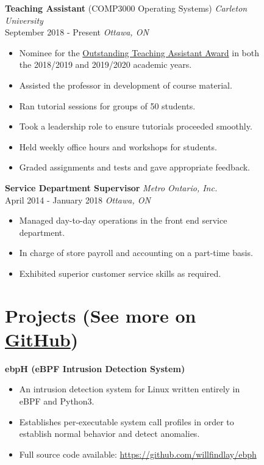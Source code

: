 \documentclass[
    10pt,
]
{article}
\begin{document}
\begin{figure}
\begin{minipage}[t]{0.65\textwidth}
\color{black}
\textbf{Teaching Assistant} (COMP3000 Operating Systems) \hfill \emph{Carleton University}\\
September 2018 - Present \hfill\emph {Ottawa, ON}
\color{gray}
\begin{itemize}[itemsep=0em]
    \item Nominee for the \href{https://carleton.ca/tasupport/taawards/edc-outstanding-ta-awards/}
        {Outstanding Teaching Assistant Award} in both the 2018/2019 and 2019/2020 academic years.
    \item Assisted the professor in development of course material.
    \item Ran tutorial sessions for groups of 50 students.
    \item Took a leadership role to ensure tutorials proceeded smoothly.
    \item Held weekly office hours and workshops for students.
    \item Graded assignments and tests and gave appropriate feedback.
\end{itemize}

\color{black}
\textbf{Service Department Supervisor} \hfill \emph{Metro Ontario, Inc.}\\
April 2014 - January 2018 \hfill\emph {Ottawa, ON}
\color{gray}
\begin{itemize}[itemsep=0em]
    \item Managed day-to-day operations in the front end service department.
    \item In charge of store payroll and accounting on a part-time basis.
    \item Exhibited superior customer service skills as required.
\end{itemize}

\section{Projects \normalfont \small (See more on \href{https://www.github.com/willfindlay}{GitHub})}

\color{black}
\textbf{ebpH (eBPF Intrusion Detection System)}
\color{gray}
\begin{itemize}[itemsep=0em]
    \item An intrusion detection system for Linux written entirely in eBPF and Python3.
    \item Establishes per-executable system call profiles in order to establish normal behavior and detect anomalies.
    \item Full source code available: \url{https://github.com/willfindlay/ebph}
\end{itemize}


\end{minipage}
\end{figure}
\end{document}
